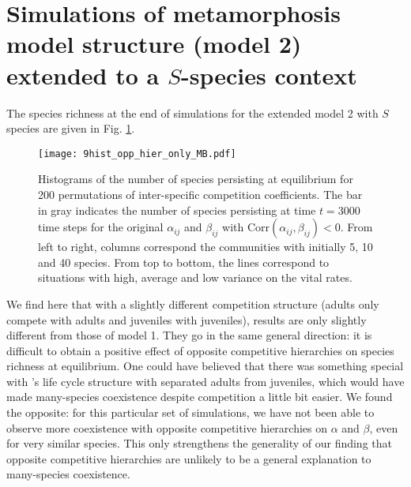 \documentclass{article}
\begin{document}
\section{Simulations of metamorphosis model structure (model 2) extended to a $S$-species context}\label{SI:sim_model_MB}
The species richness at the end of simulations for the extended model 2 with $S$ species are given in Fig. \ref{fig:hist_opp_hier_only_MB}. 
\begin{figure}[H]
    \centering
    \texttt{[image: 9hist\_opp\_hier\_only\_MB.pdf]}
    \caption{Histograms of the number of species persisting at equilibrium for 200 permutations of inter-specific competition coefficients. The bar in gray indicates the number of species persisting at time $t=3000$ time steps for the original $\alpha_{ij}$ and $\beta_{ij}$ with $\text{Corr}(\alpha_{ij}, \beta_{ij})<0$. From left to right, columns correspond the communities with initially 5, 10 and 40 species. From top to bottom, the lines correspond to situations with high, average and low variance on the vital rates.}
    \label{fig:hist_opp_hier_only_MB}
\end{figure}

We find here that with a slightly different competition structure (adults only compete with adults and juveniles with juveniles), results are only slightly different from those of model 1. They go in the same general direction: it is difficult to obtain a positive effect of opposite competitive hierarchies on species richness at equilibrium. One could have believed that there was something special with \citet{moll2008competition}'s life cycle structure with separated adults from juveniles, which would have made many-species coexistence despite competition a little bit easier. We found the opposite: for this particular set of simulations, we have not been able to observe more coexistence with opposite competitive hierarchies on $\alpha$ and $\beta$, even for very similar species. This only strengthens the generality of our finding that opposite competitive hierarchies are unlikely to be a general explanation to many-species coexistence. 
\end{document}
